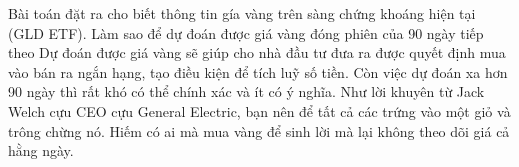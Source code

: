 Bài toán đặt ra cho biết thông tin gía vàng trên sàng chứng khoáng hiện tại (GLD ETF). Làm sao để dự đoán
được giá vàng đóng phiên của 90 ngày tiếp theo
Dự đoán được giá vàng sẽ giúp cho nhà đầu tư đưa ra được quyết định mua vào bán ra ngắn hạng, tạo điều kiện để
tích luỹ số tiền. Còn việc dự đoán xa hơn 90 ngày thì rất khó có thể chính xác và ít có ý nghĩa. Như lời khuyên từ Jack Welch cựu CEO cựu
General Electric, bạn nên để tất cả các trứng vào một giỏ và trông chừng nó. Hiếm có ai mà mua vàng để sinh lời mà lại không theo dõi giá cả hằng ngày.


